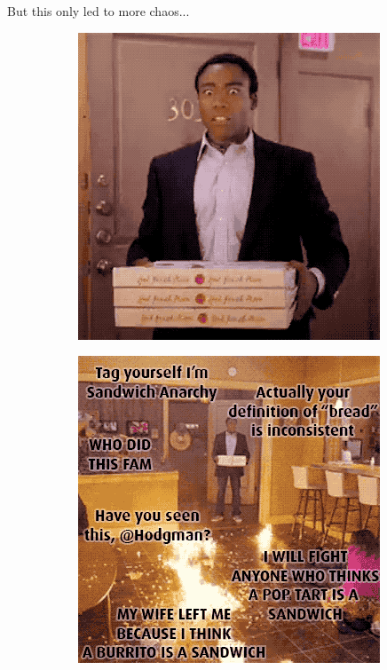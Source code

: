 \documentclass{beamer}
\begin{document}
\begin{frame}{But this only led to more chaos...}
    \begin{figure}
        \begin{subfigure}{.5\textwidth}
          \centering
          \includegraphics[width=.8\linewidth]{images/cube_rule_of_food/sandwich_chaos/slice_6.png} %
          \label{fig:sandwich-chaos-left}
        \end{subfigure}%
        \begin{subfigure}{.5\textwidth}
          \centering
          \includegraphics[width=.8\linewidth]{images/cube_rule_of_food/sandwich_chaos/slice_10.png}
          \label{fig:sandwich-chaos-right}
        \end{subfigure}
    \end{figure}
\end{frame}
\end{document}
